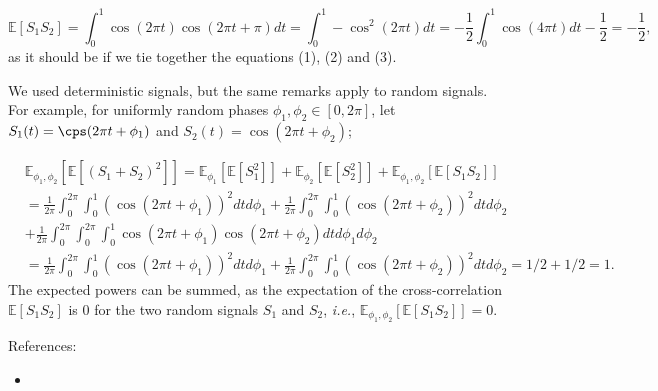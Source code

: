 \documentclass{article}
\begin{document}
$$
\mathbb{E}[S_1S_2] = \int_0^1 \cos(2 \pi t) \cos(2 \pi t + \pi) dt =\int_0^1 -\cos^2(2 \pi t )dt = - \frac{1}{2}\int_0^1 \cos(4 \pi t)dt - \frac{1}{2} = - \frac{1}{2},
$$
as it should be if we tie together the equations (1), (2) and (3).

We used deterministic signals, but the same remarks apply to random signals. For example, for uniformly random phases $\phi_1,\phi_2 \in [0,2 \pi]$, let $S_1(t) = \cps(2 \pi t + \phi_1)$ and $S_2(t) = \cos(2 \pi t + \phi_2)$;

\begin{align*}
  &\mathbb{E}_{\phi_1,\phi_2} \left[\mathbb{E}[(S_1 + S_2)^2]\right] = \mathbb{E}_{\phi_1} \left[\mathbb{E}\left[ S_1^2\right]\right] + \mathbb{E}_{\phi_2} \left[\mathbb{E}\left[ S_2^2\right]\right] +\mathbb{E}_{\phi_1,\phi_2} \left[\mathbb{E}\left[ S_1S_2\right]\right] \\
  &=\frac{1}{2 \pi}\int_0^{2 \pi} \int_0^1 (\cos(2 \pi t + \phi_1))^2dt d \phi_1 + \frac{1}{2 \pi}\int_0^{2 \pi} \int_0^1 ( \cos(2 \pi t + \phi_2))^2dt  d \phi_2 \\
  &  + \frac{1}{2 \pi}\int_0^{2 \pi} \int_0^{2 \pi}\int_0^1 \cos(2 \pi t + \phi_1) \cos(2 \pi t + \phi_2)dt d \phi_1 d \phi_2\\
  &= \frac{1}{2 \pi}\int_0^{2 \pi} \int_0^1 (\cos(2 \pi t + \phi_1))^2dt d \phi_1  + \frac{1}{2 \pi}\int_0^{2 \pi} \int_0^1 ( \cos(2 \pi t + \phi_2))^2dt  d \phi_2 = 1/2 +1/2 =1.
\end{align*}
The expected powers can be summed, as the expectation of the cross-correlation $\mathbb{E}[S_1 S_2]$ is $0$ for the two random signals $S_1$ and $S_2$, \textit{i.e.}, $\mathbb{E}_{\phi_1,\phi_2} \left[\mathbb{E}\left[ S_1S_2\right]\right] =0$.


References:
\begin{itemize}
\item {} 
\end{itemize}




\end{document}
